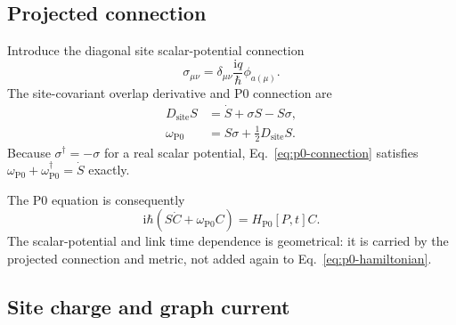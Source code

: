 \documentclass[11pt]{article}
\newcommand{\ii}{\mathrm{i}}
\newcommand{\Pzero}{\mathrm{P0}}
\begin{document}
\subsection{Projected connection}

Introduce the diagonal site scalar-potential connection
\begin{equation}
 \sigma_{\mu\nu}
 =\delta_{\mu\nu}\frac{\ii q}{\hbar}
   \phi_{a(\mu)}.
\end{equation}
The site-covariant overlap derivative and P0 connection are
\begin{align}
 D_{\mathrm{site}}S
   &=\dot S+\sigma S-S\sigma,\label{eq:site-derivative}\\
 \omega_{\Pzero}
   &=S\sigma+\frac12D_{\mathrm{site}}S.
 \label{eq:p0-connection}
\end{align}
Because \(\sigma^\dagger=-\sigma\) for a real scalar potential,
Eq.~\eqref{eq:p0-connection} satisfies
\(\omega_{\Pzero}+\omega_{\Pzero}^\dagger=\dot S\) exactly.

The P0 equation is consequently
\begin{equation}
 \ii\hbar(S\dot C+\omega_{\Pzero}C)
 =H_{\Pzero}[P,t]C .
 \label{eq:p0-eom}
\end{equation}
The scalar-potential and link time dependence is geometrical: it is carried by
the projected connection and metric, not added again to
Eq.~\eqref{eq:p0-hamiltonian}.

\subsection{Site charge and graph current}
\end{document}
